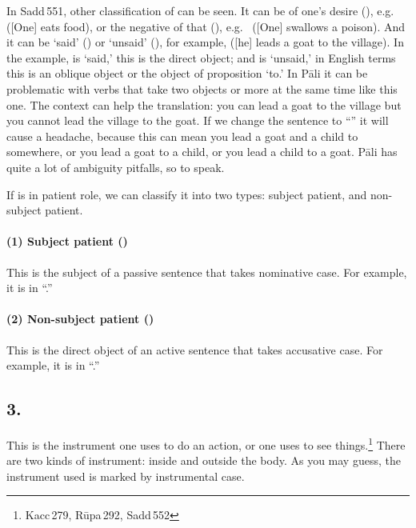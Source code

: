 In Sadd\,551, other classification of  can be seen. It can be of one's desire (), e.g.\  ([One] eats food), or the negative of that (), e.g.\  ([One] swallows a poison). And it can be `said' () or `unsaid' (), for example,  ([he] leads a goat to the village). In the example,  is `said,' this is the direct object; and  is `unsaid,' in English terms this is an oblique object or the object of proposition `to.' In P\=ali it can be problematic with verbs that take two objects or more at the same time like this one. The context can help the translation: you can lead a goat to the village but you cannot lead the village to the goat. If we change the sentence to ``'' it will cause a headache, because this can mean you lead a goat and a child to somewhere, or you lead a goat to a child, or you lead a child to a goat. P\=ali has quite a lot of ambiguity pitfalls, so to speak.

If  is in patient role, we can classify it into two types: subject patient, and non-subject patient.

\paragraph*{(1) Subject patient ()} This is the subject of a passive sentence that takes nominative case. For example, it is  in ``.''

\paragraph*{(2) Non-subject patient ()} This is the direct object of an active sentence that takes accusative case. For example, it is  in ``.''

{}
\subsection*{3.\,}

This is the instrument one uses to do an action, or one uses to see things.\footnote{Kacc\,279, R\=upa\,292, Sadd\,552} There are two kinds of instrument: inside and outside the body. As you may guess, the instrument used is marked by instrumental case.

